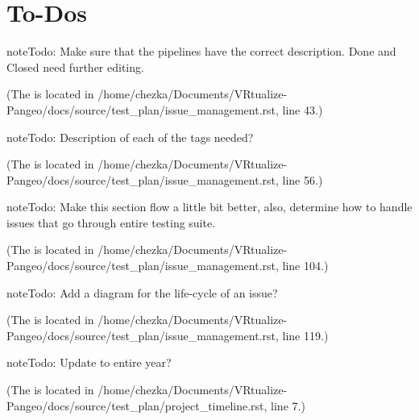\documentclass[letterpaper,10pt,english]{sphinxmanual}
\begin{document}
\chapter{To-Dos}
\label{\detokenize{index:to-dos}}
\begin{sphinxadmonition}{note}{Todo:}
Make sure that the pipelines have the correct description. Done and Closed need further editing.
\end{sphinxadmonition}

(The {\hyperref[\detokenize{test_plan/issue_management:index-0}]{}} is located in /home/chezka/Documents/VRtualize-Pangeo/docs/source/test\_plan/issue\_management.rst, line 43.)

\begin{sphinxadmonition}{note}{Todo:}
Description of each of the tags needed?
\end{sphinxadmonition}

(The {\hyperref[\detokenize{test_plan/issue_management:index-1}]{}} is located in /home/chezka/Documents/VRtualize-Pangeo/docs/source/test\_plan/issue\_management.rst, line 56.)

\begin{sphinxadmonition}{note}{Todo:}
Make this section flow a little bit better, also, determine how to handle issues that go through entire testing suite.
\end{sphinxadmonition}

(The {\hyperref[\detokenize{test_plan/issue_management:index-2}]{}} is located in /home/chezka/Documents/VRtualize-Pangeo/docs/source/test\_plan/issue\_management.rst, line 104.)

\begin{sphinxadmonition}{note}{Todo:}
Add a diagram for the life-cycle of an issue?
\end{sphinxadmonition}

(The {\hyperref[\detokenize{test_plan/issue_management:index-3}]{}} is located in /home/chezka/Documents/VRtualize-Pangeo/docs/source/test\_plan/issue\_management.rst, line 119.)

\begin{sphinxadmonition}{note}{Todo:}
Update to entire year?
\end{sphinxadmonition}

(The {\hyperref[\detokenize{test_plan/project_timeline:index-0}]{}} is located in /home/chezka/Documents/VRtualize-Pangeo/docs/source/test\_plan/project\_timeline.rst, line 7.)
\end{document}
